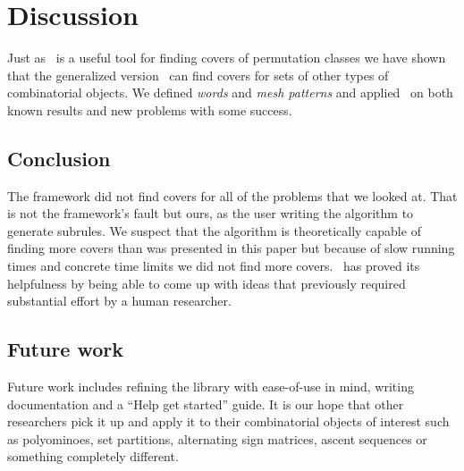 \chapter{Discussion\label{discussion chapter}}

Just as \Struct\ is a useful tool for finding covers of permutation classes we 
have shown that the generalized version \CombCov\ can find covers for sets of 
other types of combinatorial objects. We defined \emph{words} and \emph{mesh 
patterns} and applied \CombCov\ on both known results and new problems with some 
success.


\section{Conclusion\label{sec:conclusions}}

The framework did not find covers for all of the problems that we looked at. 
That is not the framework's fault but ours, as the user writing the algorithm to 
generate subrules. We suspect that the algorithm is theoretically capable of 
finding more covers than was presented in this paper but because of slow running 
times and concrete time limits we did not find more covers. \CombCov\ has proved 
its helpfulness by being able to come up with ideas that previously required 
substantial effort by a human researcher. 


\section{Future work\label{sec:future work}}

Future work includes refining the library with ease-of-use in mind, writing 
documentation and a ``Help get started'' guide. It is our hope that other 
researchers pick it up and apply it to their combinatorial objects of interest 
such as polyominoes, set partitions, alternating sign matrices, ascent sequences 
or something completely different.
